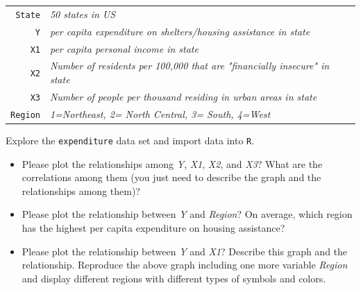 \documentclass[12pt,letterpaper]{article}
\begin{document}
\begin{tabular}{r|l}
	\texttt{State} &\emph{50 states in US} \\
	\texttt{Y} & \emph{per capita expenditure on shelters/housing assistance in state}\\
	\texttt{X1} &\emph{per capita personal income in state} \\
	\texttt{X2} &  \emph{Number of residents per 100,000 that are "financially insecure" in state}\\
	\texttt{X3} &  \emph{Number of people per thousand residing in urban areas in state} \\
	\texttt{Region} &  \emph{1=Northeast, 2= North Central, 3= South, 4=West} \\
\end{tabular}

\vspace{.5cm}
\noindent Explore the \texttt{expenditure} data set and import data into \texttt{R}.
\vspace{.5cm}
  
\vspace{.5cm}
\begin{itemize}

\item
Please plot the relationships among \emph{Y}, \emph{X1}, \emph{X2}, and \emph{X3}? What are the correlations among them (you just need to describe the graph and the relationships among them)?
\vspace{.5cm}
\item
Please plot the relationship between \emph{Y} and \emph{Region}? On average, which region has the highest per capita expenditure on housing assistance?
\vspace{.5cm}
\item
Please plot the relationship between \emph{Y} and \emph{X1}? Describe this graph and the relationship. Reproduce the above graph including one more variable \emph{Region} and display different regions with different types of symbols and colors.
\end{itemize}
\newpage
\end{document}
